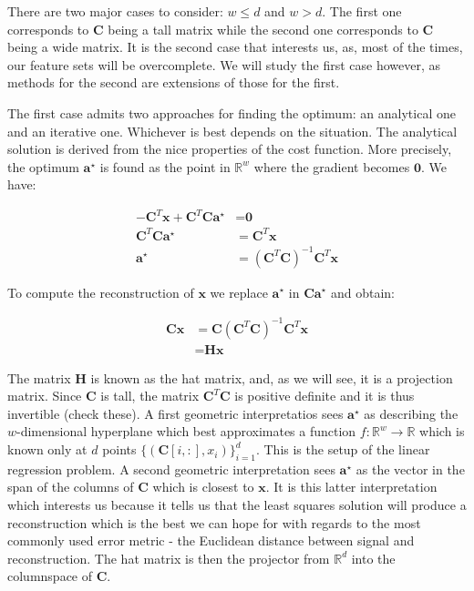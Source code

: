 \documentclass[12pt,a4paper,oneside,english]{UPBThesis}
\newcommand{\hcsignalspace}{\mathbb{R}^d}
\newcommand{\hcweightspace}{\mathbb{R}^w}
\begin{document}
There are two major cases to consider: $w \leq d$ and $w > d$. The first one corresponds to $\textbf{C}$ being a tall matrix while the second one corresponds to $\textbf{C}$ being a wide matrix. It is the second case that interests us, as, most of the times, our feature sets will be overcomplete. We will study the first case however, as methods for the second are extensions of those for the first.

The first case admits two approaches for finding the optimum: an analytical one and an iterative one. Whichever is best depends on the situation. The analytical solution is derived from the nice properties of the cost function. More precisely, the optimum $\textbf{a}^\star$ is found as the point in $\hcweightspace$ where the gradient becomes $\textbf{0}$. We have:

\begin{align*}
- \textbf{C}^T \textbf{x} + \textbf{C}^T\textbf{C}\textbf{a}^\star & = \textbf{0} \\
\textbf{C}^T\textbf{C}\textbf{a}^\star & = \textbf{C}^T\textbf{x} \\
\textbf{a}^\star & = {\left( \textbf{C}^T\textbf{C} \right)}^{-1} \textbf{C}^T\textbf{x}
\end{align*}

To compute the reconstruction of $\textbf{x}$ we replace $\textbf{a}^\star$ in $\textbf{C}\textbf{a}^\star$ and obtain:

\begin{align*}
\textbf{C}\textbf{x} & = \textbf{C}{\left( \textbf{C}^T\textbf{C} \right)}^{-1} \textbf{C}^T\textbf{x} \\
& = \textbf{H}\textbf{x}
\end{align*}

The matrix $\textbf{H}$ is known as the hat matrix, and, as we will see, it is a projection matrix. Since $\textbf{C}$ is tall, the matrix $\textbf{C}^T\textbf{C}$ is positive definite and it is thus invertible (check these). A first geometric interpretatios sees $\textbf{a}^\star$ as describing the $w$-dimensional hyperplane which best approximates a function $f:\hcweightspace \rightarrow \mathbb{R}$ which is known only at $d$ points $\{(\textbf{C}[i,:],x_i)\}_{i=1}^d$. This is the setup of the linear regression problem. A second geometric interpretation sees $\textbf{a}^\star$ as the vector in the span of the columns of $\textbf{C}$ which is closest to $\textbf{x}$. It is this latter interpretation which interests us because it tells us that the least squares solution will produce a reconstruction which is the best we can hope for with regards to the most commonly used error metric - the Euclidean distance between signal and reconstruction. The hat matrix is then the projector from $\hcsignalspace$ into the columnspace of $\textbf{C}$.
\end{document}
